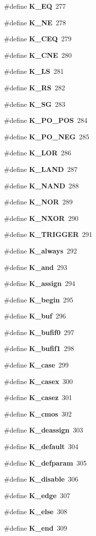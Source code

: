 \begin{CompactItemize}
\item 
\#define {\bf K\_\-EQ}\ 277
\item 
\#define {\bf K\_\-NE}\ 278
\item 
\#define {\bf K\_\-CEQ}\ 279
\item 
\#define {\bf K\_\-CNE}\ 280
\item 
\#define {\bf K\_\-LS}\ 281
\item 
\#define {\bf K\_\-RS}\ 282
\item 
\#define {\bf K\_\-SG}\ 283
\item 
\#define {\bf K\_\-PO\_\-POS}\ 284
\item 
\#define {\bf K\_\-PO\_\-NEG}\ 285
\item 
\#define {\bf K\_\-LOR}\ 286
\item 
\#define {\bf K\_\-LAND}\ 287
\item 
\#define {\bf K\_\-NAND}\ 288
\item 
\#define {\bf K\_\-NOR}\ 289
\item 
\#define {\bf K\_\-NXOR}\ 290
\item 
\#define {\bf K\_\-TRIGGER}\ 291
\item 
\#define {\bf K\_\-always}\ 292
\item 
\#define {\bf K\_\-and}\ 293
\item 
\#define {\bf K\_\-assign}\ 294
\item 
\#define {\bf K\_\-begin}\ 295
\item 
\#define {\bf K\_\-buf}\ 296
\item 
\#define {\bf K\_\-bufif0}\ 297
\item 
\#define {\bf K\_\-bufif1}\ 298
\item 
\#define {\bf K\_\-case}\ 299
\item 
\#define {\bf K\_\-casex}\ 300
\item 
\#define {\bf K\_\-casez}\ 301
\item 
\#define {\bf K\_\-cmos}\ 302
\item 
\#define {\bf K\_\-deassign}\ 303
\item 
\#define {\bf K\_\-default}\ 304
\item 
\#define {\bf K\_\-defparam}\ 305
\item 
\#define {\bf K\_\-disable}\ 306
\item 
\#define {\bf K\_\-edge}\ 307
\item 
\#define {\bf K\_\-else}\ 308
\item 
\#define {\bf K\_\-end}\ 309
\item 

\end{CompactItemize}
